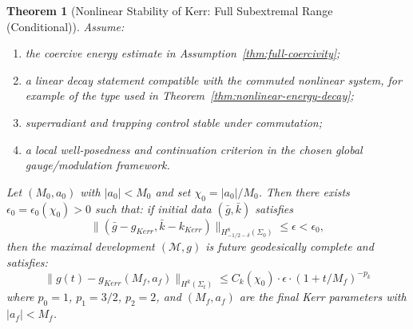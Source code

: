 \documentclass[12pt,a4paper]{article}
\newtheorem{theorem}{Theorem}[section]
\begin{document}
\begin{theorem}[Nonlinear Stability of Kerr: Full Subextremal Range (Conditional)]\label{thm:main-nonlinear}
Assume:
\begin{enumerate}
    \item the coercive energy estimate in Assumption~\ref{thm:full-coercivity};
    \item a linear decay statement compatible with the commuted nonlinear system, for example of the type used in Theorem~\ref{thm:nonlinear-energy-decay};
    \item superradiant and trapping control stable under commutation;
    \item a local well-posedness and continuation criterion in the chosen global gauge/modulation framework.
\end{enumerate}
Let $(M_0, a_0)$ with $|a_0| < M_0$ and set $\chi_0 = |a_0|/M_0$. Then there exists $\epsilon_0 = \epsilon_0(\chi_0) > 0$ such that: if initial data $(\bar{g}, \bar{k})$ satisfies
\begin{equation}
\|(\bar{g} - g_{Kerr}, \bar{k} - k_{Kerr})\|_{H^8_{-1/2-\delta}(\Sigma_0)} \leq \epsilon < \epsilon_0,
\end{equation}
then the maximal development $(\mathcal{M}, g)$ is future geodesically complete and satisfies:
\begin{equation}
\|g(t) - g_{Kerr}(M_f, a_f)\|_{H^k(\Sigma_t)} \leq C_k(\chi_0) \cdot \epsilon \cdot (1 + t/M_f)^{-p_k}
\end{equation}
where $p_0 = 1$, $p_1 = 3/2$, $p_2 = 2$, and $(M_f, a_f)$ are the final Kerr parameters with $|a_f| < M_f$.
\end{theorem}
\end{document}
